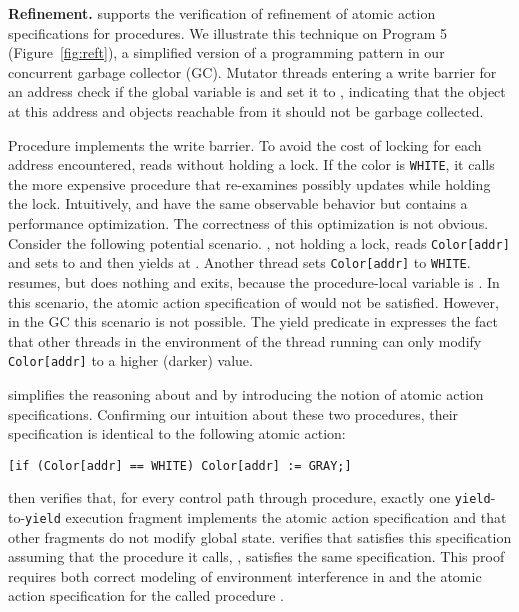 {\bf Refinement.} 
\civl supports the verification of refinement of atomic action specifications for procedures. 
We illustrate this technique on Program 5 (Figure~\ref{fig:reft}),
a simplified version of a programming pattern in our concurrent garbage collector (GC).
Mutator threads entering a write barrier for an address  check
if the global variable  is 
and set it to , indicating that the object at this address
and objects reachable from it should not be garbage collected. 

Procedure  implements the write barrier.
To avoid the cost of locking for each address encountered,  reads  without holding a lock.
If the color is {\tt WHITE}, it calls the more expensive procedure  
that re-examines possibly updates  while holding the lock.
Intuitively,  and  have the same observable behavior but 
 contains a performance optimization. 
The correctness of this
optimization is not obvious. Consider the following potential
scenario. , not holding a lock, reads {\tt Color[addr]} and
sets  to  and then yields at
. Another thread sets {\tt Color[addr]} to
{\tt WHITE}.  resumes, but does nothing and exits,
because the procedure-local variable  is . In this scenario, the atomic action
specification of  would not be satisfied. However, in the GC this
scenario is not possible. 
The yield predicate in  expresses the fact that
other threads in the environment of the thread running  can
only modify {\tt Color[addr]} to a higher (darker) value. 

\civl simplifies the reasoning about  and  by introducing the notion 
of atomic action specifications.
Confirming our intuition about these two procedures, their specification is identical
to the following atomic action:
\begin{verbatim}
[if (Color[addr] == WHITE) Color[addr] := GRAY;]
\end{verbatim}
\civl then verifies that, for every control path through 
procedure, exactly one {\tt yield}-to-{\tt yield} execution
fragment implements the atomic action specification and that other fragments do not modify
global state. 
\civl verifies that  satisfies this specification
assuming that the procedure it calls, , satisfies the same specification.
This proof requires both correct modeling of environment interference in 
and the atomic action specification for the called procedure .

